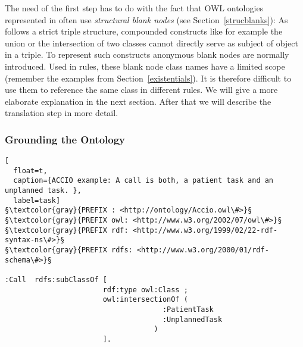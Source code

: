 The need of the first step has to do with the fact that 
OWL ontologies represented in \rdf often use \emph{structural blank nodes} (see Section~\ref{strucblanks}):
As \rdf follows a strict triple structure, compounded constructs like for example the union or the intersection of two classes cannot directly serve as subject of object in a triple. 
To represent such constructs anonymous blank nodes are normally introduced.
Used in rules, 
these blank node class names have a 
limited scope (remember the examples from Section~\ref{existentials}). It is therefore difficult to use them to reference the same class in different rules. 
We will give a more elaborate explanation in the next section. 
After that we will describe the translation step in more detail.



\subsubsection{Grounding the Ontology}
\begin{lstlisting}[
  float=t,
  caption={ACCIO example: A call is both, a patient task and an unplanned task. },
  label=task]
§\textcolor{gray}{PREFIX : <http://ontology/Accio.owl\#>}§
§\textcolor{gray}{PREFIX owl: <http://www.w3.org/2002/07/owl\#>}§
§\textcolor{gray}{PREFIX rdf: <http://www.w3.org/1999/02/22-rdf-syntax-ns\#>}§
§\textcolor{gray}{PREFIX rdfs: <http://www.w3.org/2000/01/rdf-schema\#>}§

:Call  rdfs:subClassOf [ 
                       rdf:type owl:Class ;
                       owl:intersectionOf ( 
                                     :PatientTask
                                     :UnplannedTask
                                   )
                       ].
\end{lstlisting}


